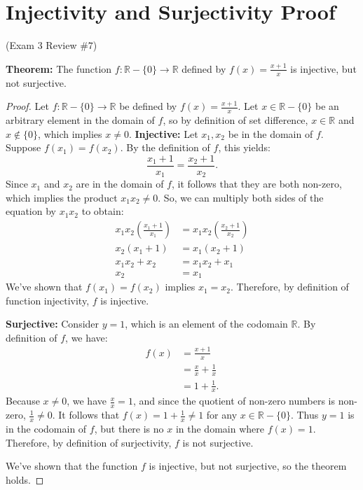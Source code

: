 \documentclass[12pt]{amsart}
\begin{document}
\section{Injectivity and Surjectivity Proof}
\begin{center}(Exam 3 Review $\#7$)\end{center}
\textbf{Theorem:} The function $f: \mathbb{R}-\{0\} \rightarrow \mathbb{R}$ defined by $f(x) = \frac{x+1}{x}$ is injective, but not surjective.
\begin{proof}
Let $f: \mathbb{R} - \{0\} \rightarrow \mathbb{R}$ be defined by $f(x)=\frac{x+1}{x}$. Let $x\in \mathbb{R}-\{0\}$ be an arbitrary element in the domain of $f$, so by definition of set difference, $x\in \mathbb{R}$ and $x \notin \{0\}$, which implies $x\ne0$.
\medskip
\newline
\textbf{Injective:} 
Let $x_1,x_2$ be in the domain of $f$. Suppose $f(x_1) = f(x_2)$. By the definition of $f$, this yields:
\[
    \frac{x_1+1}{x_1} = \frac{x_2+1}{x_2}.
\]
Since $x_1$ and $x_2$ are in the domain of $f$, it follows that they are both non-zero, which implies the product $x_1x_2 \ne 0$. So, we can multiply both sides of the equation by $x_1x_2$ to obtain:
\begin{align*}
    x_{1}x_{2}\left(\frac{x_1+1}{x_1}\right) &= x_{1}x_{2}\left(\frac{x_2+1}{x_2}\right) \\
    x_2(x_1+1) &= x_1(x_2+1)\\
    x_1x_2+x_2 &= x_1x_2+x_1 \\
    x_2 &= x_1
\end{align*}
We've shown that $f(x_1)=f(x_2)$ implies $x_1=x_2$. Therefore, by definition of function injectivity, $f$ is injective.

\medskip
\textbf{Surjective:} 
Consider $y = 1$, which is an element of the codomain $\mathbb{R}$. By definition of $f$, we have:
\begin{align*}
    f(x) &= \frac{x+1}{x}\\
         &= \frac{x}{x}+\frac{1}{x}\\
         &= 1+\frac{1}{x}.
\end{align*}
Because $x \neq 0$, we have $\frac{x}{x} = 1$, and since the quotient of non-zero numbers is non-zero, $\frac{1}{x} \neq 0$. It follows that $f(x) = 1 + \frac{1}{x} \neq 1$ for any $x \in \mathbb{R}-\{0\}$. Thus $y = 1$ is in the codomain of $f$, but there is no $x$ in the domain where $f(x)=1$. Therefore, by definition of surjectivity, $f$ is not surjective. 

We've shown that the function $f$ is injective, but not surjective, so the theorem holds.
\end{proof}
\newpage
\end{document}
